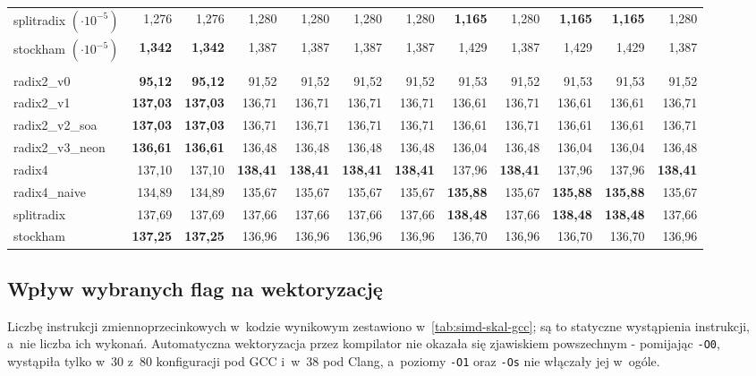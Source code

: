 \begin{table}[H]
\begin{tabular}{lrrrrrrrrrrr}
splitradix $(\cdot 10^{-5})$ & 1,276 & 1,276 & 1,280 & 1,280 & 1,280 & 1,280 & \textbf{1,165} & 1,280 & \textbf{1,165} & \textbf{1,165} & 1,280 \\
stockham $(\cdot 10^{-5})$ & \textbf{1,342} & \textbf{1,342} & 1,387 & 1,387 & 1,387 & 1,387 & 1,429 & 1,387 & 1,429 & 1,429 & 1,387 \\
\addlinespace
\multicolumn{12}{l}{\textit{Stosunek sygnału do szumu SNR [dB]}} \\[2pt]
radix2\_v0 & \textbf{95,12} & \textbf{95,12} & 91,52 & 91,52 & 91,52 & 91,52 & 91,53 & 91,52 & 91,53 & 91,53 & 91,52 \\
radix2\_v1 & \textbf{137,03} & \textbf{137,03} & 136,71 & 136,71 & 136,71 & 136,71 & 136,61 & 136,71 & 136,61 & 136,61 & 136,71 \\
radix2\_v2\_soa & \textbf{137,03} & \textbf{137,03} & 136,71 & 136,71 & 136,71 & 136,71 & 136,61 & 136,71 & 136,61 & 136,61 & 136,71 \\
radix2\_v3\_neon & \textbf{136,61} & \textbf{136,61} & 136,48 & 136,48 & 136,48 & 136,48 & 136,04 & 136,48 & 136,04 & 136,04 & 136,48 \\
radix4 & 137,10 & 137,10 & \textbf{138,41} & \textbf{138,41} & \textbf{138,41} & \textbf{138,41} & 137,96 & \textbf{138,41} & 137,96 & 137,96 & \textbf{138,41} \\
radix4\_naive & 134,89 & 134,89 & 135,67 & 135,67 & 135,67 & 135,67 & \textbf{135,88} & 135,67 & \textbf{135,88} & \textbf{135,88} & 135,67 \\
splitradix & 137,69 & 137,69 & 137,66 & 137,66 & 137,66 & 137,66 & \textbf{138,48} & 137,66 & \textbf{138,48} & \textbf{138,48} & 137,66 \\
stockham & \textbf{137,25} & \textbf{137,25} & 136,96 & 136,96 & 136,96 & 136,96 & 136,70 & 136,96 & 136,70 & 136,70 & 136,96 \\
\bottomrule
\end{tabular}
\end{table}

\subsection{Wpływ wybranych flag na wektoryzację}\label{sec:WplywFlagWektoryzacja}
Liczbę instrukcji zmiennoprzecinkowych w~kodzie wynikowym zestawiono
w~\cref{tab:simd-skal-gcc}; są to statyczne wystąpienia instrukcji, a~nie liczba
ich wykonań. Automatyczna wektoryzacja przez kompilator nie okazała się zjawiskiem powszechnym -
pomijając \texttt{-O0}, wystąpiła tylko  w~30 z~80 konfiguracji pod GCC i~w~38 pod
Clang, a~poziomy \texttt{-O1} oraz \texttt{-Os} nie włączały jej w~ogóle.

